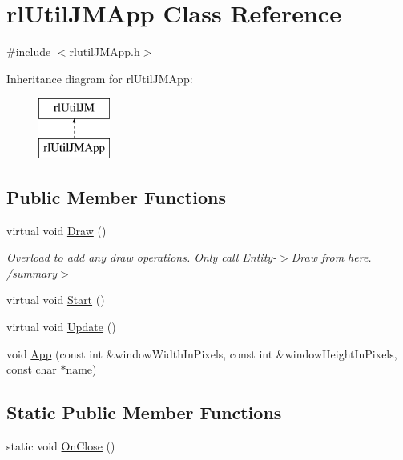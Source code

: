 \hypertarget{classrl_util_j_m_app}{}\section{rl\+Util\+J\+M\+App Class Reference}
\label{classrl_util_j_m_app}


{\ttfamily \#include $<$rlutil\+J\+M\+App.\+h$>$}

Inheritance diagram for rl\+Util\+J\+M\+App\+:\begin{figure}[H]
\begin{center}
\leavevmode
\includegraphics[height=2.000000cm]{classrl_util_j_m_app}
\end{center}
\end{figure}
\subsection*{Public Member Functions}
\begin{DoxyCompactItemize}
\item 
virtual void \hyperlink{classrl_util_j_m_app_ae8abc1581be03bd0dd50ec4fcd915062}{Draw} ()
\begin{DoxyCompactList}\small\item\em Overload to add any draw operations. Only call Entity-\/$>$Draw from here. /summary$>$ \end{DoxyCompactList}\item 
virtual void \hyperlink{classrl_util_j_m_app_afeeb2c2481b03b070958827c16f90ebe}{Start} ()
\item 
virtual void \hyperlink{classrl_util_j_m_app_ab2d1c8458f70c9846f7e47804e433491}{Update} ()
\item 
void \hyperlink{classrl_util_j_m_app_a322eb5957d1fea6fe19423085ed9fb33}{App} (const int \&window\+Width\+In\+Pixels, const int \&window\+Height\+In\+Pixels, const char $\ast$name)
\end{DoxyCompactItemize}
\subsection*{Static Public Member Functions}
\begin{DoxyCompactItemize}
\item 
static void \hyperlink{classrl_util_j_m_app_a3f4f4b35aa1c6aa9ec469452c705d276}{On\+Close} ()
\end{DoxyCompactItemize}
